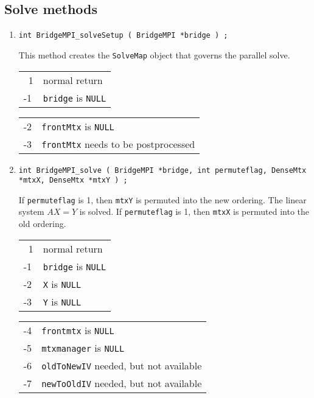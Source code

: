 \subsection{Solve methods}
\label{subsection:BridgeMPI:proto:solve}
\par
\begin{enumerate}
\item
\begin{verbatim}
int BridgeMPI_solveSetup ( BridgeMPI *bridge ) ;
\end{verbatim}
This method creates the {\tt SolveMap} object that governs the
parallel solve.
\par {}
\begin{center}
\begin{tabular}{ll}
~1 & normal return \\
-1 & \texttt{bridge} is \texttt{NULL}
\end{tabular}
\begin{tabular}{ll}
-2 & \texttt{frontMtx} is \texttt{NULL} \\
-3 & \texttt{frontMtx} needs to be postprocessed
\end{tabular}
\end{center}
\item
\begin{verbatim}
int BridgeMPI_solve ( BridgeMPI *bridge, int permuteflag, DenseMtx *mtxX, DenseMtx *mtxY ) ;
\end{verbatim}
If \texttt{permuteflag} is 1, then \texttt{mtxY} is permuted into
the new ordering.
The linear system $AX = Y$ is solved.
If \texttt{permuteflag} is 1, then \texttt{mtxX} is permuted into
the old ordering.
\par {}
\begin{center}
\begin{tabular}{ll}
~1 & normal return \\
-1 & \texttt{bridge} is \texttt{NULL} \\
-2 & \texttt{X} is \texttt{NULL} \\
-3 & \texttt{Y} is \texttt{NULL} \\
\end{tabular}
\begin{tabular}{ll}
-4 & \texttt{frontmtx} is \texttt{NULL} \\
-5 & \texttt{mtxmanager} is \texttt{NULL} \\
-6 & \texttt{oldToNewIV} needed, but not available \\
-7 & \texttt{newToOldIV} needed, but not available \\
\end{tabular}
\end{center}
\end{enumerate}
